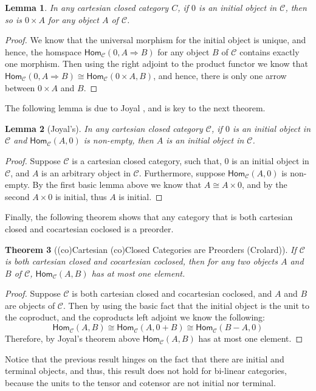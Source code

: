 \documentclass{lmcs}
\newtheorem{theorem}{Theorem}
\newtheorem{lemma}[theorem]{Lemma}
\newcommand{\cat}[1]{\mathcal{#1}}
\newcommand{\Hom}[3]{\mathsf{Hom}_{\cat{#1}}(#2,#3)}
\begin{document}
\begin{lemma}
  \label{lemma:products-of-initial-gives-initial}
  In any cartesian closed category $C$, if $0$ is an initial
  object in $\cat{C}$, then so is $0 \times A$ for any object $A$
  of $\cat{C}$.
\end{lemma}
\begin{proof}
    We know that the universal morphism for the initial object is
    unique, and hence, the homspace $\Hom{C}{0}{A \Rightarrow B}$ for
    any object $B$ of $\cat{C}$ contains exactly one morphism.  Then
    using the right adjoint to the product functor we know that
    $\Hom{C}{0}{A \Rightarrow B} \cong \Hom{C}{0 \times A}{B}$, and
    hence, there is only one arrow between $0 \times A$ and $B$.
\end{proof}
\noindent
The following lemma is due to Joyal \cite{?}, and is key to the next
theorem.
\begin{lemma}[Joyal's]
  \label{lemma:joyals}
  In any cartesian closed category $\cat{C}$, if $0$ is an initial
  object in $\cat{C}$ and $\Hom{C}{A}{0}$ is non-empty, then $A$ is an
  initial object in $\cat{C}$.
\end{lemma}
\begin{proof}
  Suppose $\cat{C}$ is a cartesian closed category, such that, $0$ is
  an initial object in $\cat{C}$, and $A$ is an arbitrary object in
  $\cat{C}$.  Furthermore, suppose $\Hom{C}{A}{0}$ is non-empty.  By
  the first basic lemma above we know that $A \cong A \times 0$, and
  by the second $A \times 0$ is initial, thus $A$ is initial.
\end{proof}
Finally, the following theorem shows that any category that is both
cartesian closed and cocartesian coclosed is a preorder.
\begin{theorem}[(co)Cartesian (co)Closed Categories are Preorders (Crolard\cite{Crolard:2001})]
  \label{thm:dengerate-to-preorder}
  If $\cat{C}$ is both cartesian closed and cocartesian coclosed, then
  for any two objects $A$ and $B$ of $\cat{C}$, $\Hom{C}{A}{B}$ has at
  most one element.
\end{theorem}
\begin{proof}
  Suppose $\cat{C}$ is both cartesian closed and cocartesian coclosed,
  and $A$ and $B$ are objects of $\cat{C}$.  Then by using the basic
  fact that the initial object is the unit to the coproduct, and the
  coproducts left adjoint we know the following:
  \[\Hom{C}{A}{B} \cong \Hom{C}{A}{0 + B} \cong \Hom{C}{B - A}{0}\]
  Therefore, by Joyal's theorem above $\Hom{C}{A}{B}$ has at most one
  element.
\end{proof}
\noindent
Notice that the previous result hinges on the fact that there are
initial and terminal objects, and thus, this result does not hold for
bi-linear categories, because the units to the tensor and cotensor are
not initial nor terminal.
\end{document}
